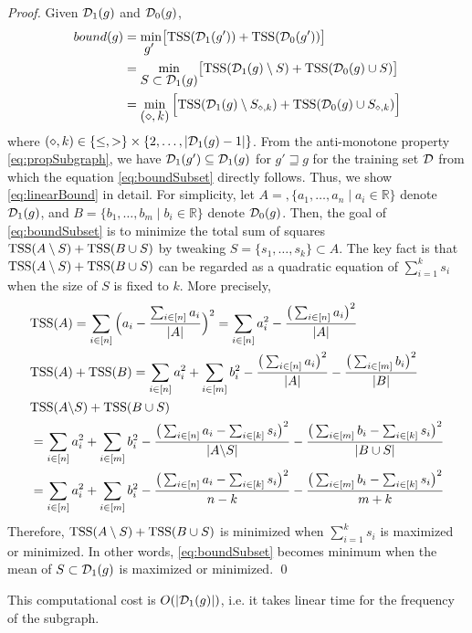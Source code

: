 \begin{proof}
  Given $\mathcal{D}_1(g)$ and $\mathcal{D}_0(g)$,
  \small
  \begin{align}
    bound(g) &= \mymin{g'} \bigl[ \tss(\D_1(g')) + \tss(\D_0(g'))  \bigr] \notag \\
    \label{eq:boundSubset}
    &= \mymin{S \subset \D_1(g)} \bigl[ \tss(\D_1(g) \setminus S) + \tss(\D_0(g) \cup S)  \bigr] \\
    \label{eq:linearBound}
    &= \mymin{(\diamond,k)} \Big[ \tss(\D_1(g) \setminus S_{\diamond,k}) + \tss(\D_0(g) \cup S_{\diamond,k}) \Big]
  \end{align}\normalsize
  where $ (\diamond, k) \in \{ \leq, > \} \times \{ 2, \dots, |\mathcal{D}_1(g) - 1| \} $.
  From the anti-monotone property \eqref{eq:propSubgraph}, we have
  $\mathcal{D}_1(g') \subseteq \mathcal{D}_1(g)$ for $g' \sqsupseteq g$
  for the training set $\mathcal{D}$ from which the equation \eqref{eq:boundSubset}
  directly follows. Thus, we show \eqref{eq:linearBound} in
  detail. For simplicity,
  let $A =,\{ a_1, \dots, a_n \mid a_i \in \mathbb{R} \}$ denote $\mathcal{D}_1(g)$,
  and $B = \{ b_1, \dots, b_m \mid b_i \in \mathbb{R} \}$ denote $\mathcal{D}_0(g)$.
  Then, the goal of \eqref{eq:boundSubset} is to minimize the total sum
  of squares $\mathrm{TSS}(A \setminus S) + \mathrm{TSS}(B \cup S)$ by tweaking
  $S = \{ s_1, \dots, s_k \} \subset A$.
  The key fact is that $\mathrm{TSS}(A \setminus S) + \mathrm{TSS}(B \cup S)$ can
  be regarded as a quadratic equation of $\sum_{i=1}^k s_i$ when the size
  of $S$ is fixed to $k$. More precisely,
  \begingroup
  \allowdisplaybreaks
	\begin{align*}
	  &\mathrm{TSS}(A) 
	  = \sum_{i \in[n]} \Big(a_i - \frac{\sum_{i \in[n]}a_i}{|A|}\Big)^2
	  = \sum_{i \in[n]} a_i^2 - \frac{\big(\sum_{i \in[n]} a_i\big)^2}{|A|} \\
	  &\mathrm{TSS}(A) + \mathrm{TSS}(B) 
	  = \sum_{i \in[n]} a_i^2 + \sum_{i \in[m]} b_i^2 - \frac{\big(\sum_{i \in[n]} a_i\big)^2}{|A|} - \frac{\big(\sum_{i \in[m]} b_i\big)^2}{|B|} \\
	  &\mathrm{TSS}(A \backslash S) + \mathrm{TSS}(B \cup S) \\
	  &= \sum_{i \in[n]} a_i^2 + \sum_{i \in[m]} b_i^2 - \frac{\big(\sum_{i \in[n]} a_i - \sum_{i \in[k]} s_i\big)^2}{|A \backslash S|} - \frac{\big(\sum_{i \in[m]} b_i - \sum_{i \in[k]} s_i\big)^2}{|B \cup S|} \\
	  &= \sum_{i \in[n]} a_i^2 + \sum_{i \in[m]} b_i^2 - \frac{\big(\sum_{i \in[n]} a_i - \sum_{i \in[k]} s_i\big)^2}{n - k} - \frac{\big(\sum_{i \in[m]} b_i - \sum_{i \in[k]} s_i\big)^2}{m + k} \\
	\end{align*}
      \endgroup
      Therefore, $\mathrm{TSS}(A \setminus S) + \mathrm{TSS}(B \cup S)$ is minimized
      when $\sum_{i=1}^k s_i$ is maximized or minimized. In other words,
      \eqref{eq:boundSubset} becomes minimum when the mean of $S \subset
      \mathcal{D}_1(g)$ is maximized or minimized.
	  \qed
\end{proof}
This computational cost is $O(|\mathcal{D}_1(g)|)$, i.e. it takes linear time for the frequency of the subgraph.
